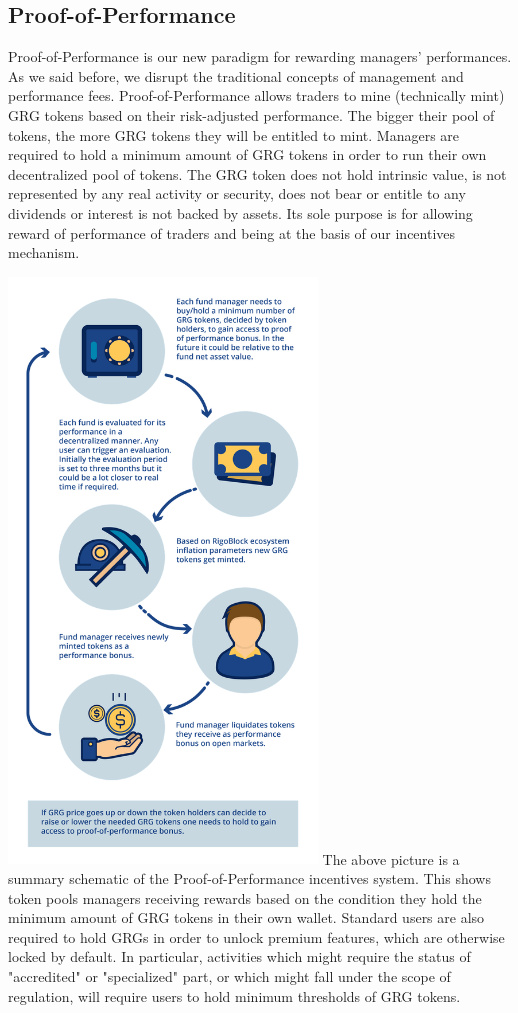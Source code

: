 \documentclass[9pt,oneside]{amsart}
\begin{document}
\begin{multicols}{2}
\section{Proof-of-Performance}
Proof-of-Performance is our new paradigm for rewarding managers’ performances. As we said before, we disrupt the traditional concepts of management and performance fees. Proof-of-Performance allows traders to mine (technically mint) GRG tokens based on their risk-adjusted performance. The bigger their pool of tokens, the more GRG tokens they will be entitled to mint. Managers are required to hold a minimum amount of GRG tokens in order to run their own decentralized pool of tokens.
The GRG token does not hold intrinsic value, is not represented by any real activity or security, does not bear or entitle to any dividends or interest is not backed by assets. Its sole purpose is for allowing reward of performance of traders and being at the basis of our incentives mechanism.

\includegraphics[width=8.2cm]{pop-tokenomics.png}
The above picture is a summary schematic of the Proof-of-Performance incentives system. This shows token pools managers receiving rewards based on the condition they hold the minimum amount of GRG tokens in their own wallet.
Standard users are also required to hold GRGs in order to unlock premium features, which are otherwise locked by default. In particular, activities which might require the status of "accredited" or "specialized" part, or which might fall under the scope of regulation, will require users to hold minimum thresholds of GRG tokens.


\end{multicols}
\end{document}
